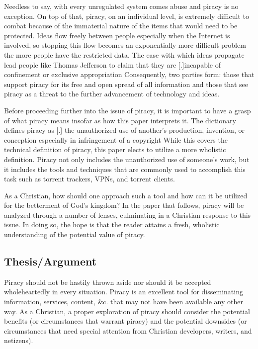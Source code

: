 \documentclass[onecolumn, 12pt]{article}
\begin{document}
\begin{refsection}
Needless to say, with every unregulated system comes abuse and piracy is no exception.
On top of that, piracy, on an individual level, is extremely difficult to combat because
of the immaterial nature of the items that would need to be protected. Ideas flow freely
between people especially when the Internet is involved, so stopping this flow becomes an
exponentially more difficult problem the more people have the restricted data. The ease
with which ideas propagate lead people like Thomas Jefferson to claim that they are
[.]{incapable of confinement or exclusive appropriation}
Consequently, two parties form: those that support piracy for its free and open spread
of all information and those that see piracy as a threat to the further advancement of
technology and ideas.

Before proceeding further into the issue of piracy, it is important to have a grasp of
what piracy means insofar as how this paper interprets it. The dictionary defines piracy
as [.]{%
  the unauthorized use of another's production, invention, or conception
  especially in infringement of a copyright%
} While this covers the technical definition of piracy, this paper elects to utilize a
more wholistic definition. Piracy not only includes the unauthorized use of someone's
work, but it includes the tools and techniques that are commonly used to accomplish
this task such as torrent trackers, VPNs, and torrent clients.

As a Christian, how should one approach such a tool and how can it be utilized for the
betterment of God's kingdom? In the paper that follows, piracy will be analyzed through a
number of lenses, culminating in a Christian response to this issue. In doing so, the hope
is that the reader attains a fresh, wholistic understanding of the potential value of
piracy.

\subsection{Thesis/Argument}
Piracy should not be hastily thrown aside nor should it be accepted
wholeheartedly in every situation. Piracy is an excellent tool for
disseminating information, services, content, \&c. that may not have been
available any other way. As a Christian, a proper exploration of piracy should
consider the potential benefits (or circumstances that warrant piracy) and the
potential downsides (or circumstances that need special attention from
Christian developers, writers, and netizens).


\end{refsection}
\end{document}
